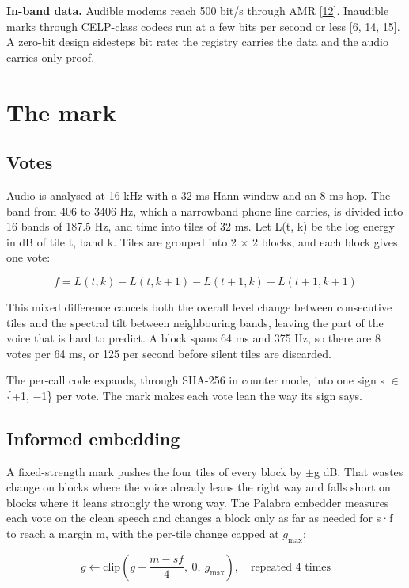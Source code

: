 \documentclass[10pt,a4paper]{article}
\begin{document}
\textbf{In-band data.} Audible modems reach 500 bit/s through AMR {[}\hyperlink{ref-12}{12}{]}. Inaudible marks through CELP-class codecs run at a few bits per second or less {[}\hyperlink{ref-6}{6}, \hyperlink{ref-14}{14}, \hyperlink{ref-15}{15}{]}. A zero-bit design sidesteps bit rate: the registry carries the data and the audio carries only proof.

\section{The mark}\label{s-4}

\subsection{Votes}\label{s-4-1}

Audio is analysed at 16 kHz with a 32 ms Hann window and an 8 ms hop. The band from 406 to 3406 Hz, which a narrowband phone line carries, is divided into 16 bands of 187.5 Hz, and time into tiles of 32 ms. Let L(t, k) be the log energy in dB of tile t, band k. Tiles are grouped into 2 $\times$ 2 blocks, and each block gives one vote:

\[f = L(t, k) - L(t, k+1) - L(t+1, k) + L(t+1, k+1)\]

This mixed difference cancels both the overall level change between consecutive tiles and the spectral tilt between neighbouring bands, leaving the part of the voice that is hard to predict. A block spans 64 ms and 375 Hz, so there are 8 votes per 64 ms, or 125 per second before silent tiles are discarded.

The per-call code expands, through SHA-256 in counter mode, into one sign s $\in$ \{+1, $-$1\} per vote. The mark makes each vote lean the way its sign says.

\subsection{Informed embedding}\label{s-4-2}

A fixed-strength mark pushes the four tiles of every block by $\pm$g dB. That wastes change on blocks where the voice already leans the right way and falls short on blocks where it leans strongly the wrong way. The Palabra embedder measures each vote on the clean speech and changes a block only as far as needed for s·f to reach a margin m, with the per-tile change capped at $g_{\max}$:

\[g \leftarrow \mathrm{clip}\!\left( g + \frac{m - s f}{4},\ 0,\ g_{\max} \right), \quad \mbox{repeated 4 times}\]
\end{document}
